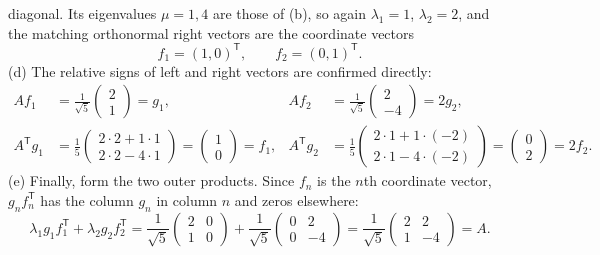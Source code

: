 diagonal. Its eigenvalues $\mu=1,4$ are those of (b), so again
$\lambda_1=1$, $\lambda_2=2$, and the matching orthonormal right vectors
are the coordinate vectors
\[
f_1=(1,0)^{\mathsf T},\qquad f_2=(0,1)^{\mathsf T}.
\]
(d) The relative signs of left and right vectors are confirmed directly:
\begin{align*}
Af_1&=\frac1{\sqrt5}\begin{pmatrix}2\\1\end{pmatrix}=g_1,
&Af_2&=\frac1{\sqrt5}\begin{pmatrix}2\\-4\end{pmatrix}=2g_2,\\
A^{\mathsf T}g_1
&=\frac15\begin{pmatrix}2\cdot2+1\cdot1\\2\cdot2-4\cdot1\end{pmatrix}
=\begin{pmatrix}1\\0\end{pmatrix}=f_1,
&A^{\mathsf T}g_2
&=\frac15\begin{pmatrix}2\cdot1+1\cdot(-2)\\2\cdot1-4\cdot(-2)\end{pmatrix}
=\begin{pmatrix}0\\2\end{pmatrix}=2f_2.
\end{align*}
(e) Finally, form the two outer products. Since $f_n$ is the $n$th
coordinate vector, $g_nf_n^{\mathsf T}$ has the column $g_n$ in
column $n$ and zeros elsewhere:
\[
\lambda_1g_1f_1^{\mathsf T}+\lambda_2g_2f_2^{\mathsf T}
=\frac1{\sqrt5}\begin{pmatrix}2&0\\1&0\end{pmatrix}
 +\frac1{\sqrt5}\begin{pmatrix}0&2\\0&-4\end{pmatrix}
=\boxed{\frac1{\sqrt5}\begin{pmatrix}2&2\\1&-4\end{pmatrix}=A.}
\]

